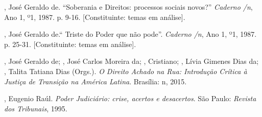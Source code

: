 \begin{Parskip}
 , José Geraldo de.
``Soberania e Direitos: processos sociais
novos?'' \emph{Caderno /n}, Ano 1, º1,
1987. p. 9-16. {[}Constituinte: temas em análise{]}.

 , José Geraldo de.`` Triste do Poder que não pode''.
\emph{Caderno /n}, Ano 1, º1, 1987. p. 25-31. {[}Constituinte:
temas em análise{]}.

 , José Geraldo de;  , José Carlos Moreira da;
, Cristiano; , Lívia Gimenes Dias da; , Talita
Tatiana Dias (Orgs.). \emph{O Direito Achado na Rua: Introdução
Crítica à Justiça de Transição na América Latina}. Brasília: n, 2015.

, Eugenio Raúl. \emph{Poder Judiciário: crise, acertos e
desacertos}. São Paulo: \emph{Revista dos Tribunais}, 1995.
\end{Parskip}